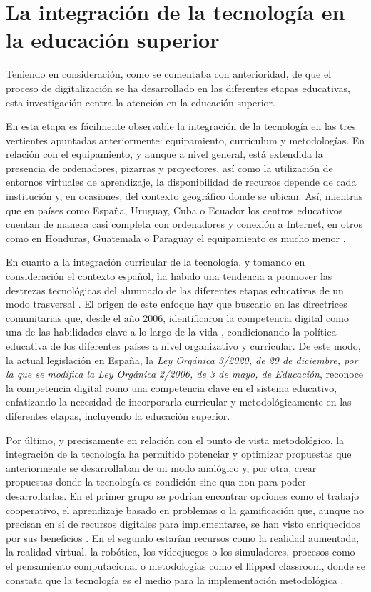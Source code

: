 \section{La integración de la tecnología en la educación superior}\label{sec-laintegracióndelatecnologíaenlaeducaciónsuperior}

Teniendo en consideración, como se comentaba con anterioridad, de que el
proceso de digitalización se ha desarrollado en las diferentes etapas
educativas, esta investigación centra la atención en la educación
superior.

En esta etapa es fácilmente observable la integración de la tecnología
en las tres vertientes apuntadas anteriormente: equipamiento, currículum
y metodologías. En relación con el equipamiento, y aunque a nivel
general, está extendida la presencia de ordenadores, pizarras y
proyectores, así como la utilización de entornos virtuales de
aprendizaje, la disponibilidad de recursos depende de cada institución
y, en ocasiones, del contexto geográfico donde se ubican. Así, mientras
que en países como España, Uruguay, Cuba o Ecuador los centros
educativos cuentan de manera casi completa con ordenadores y conexión a
Internet, en otros como en Honduras, Guatemala o Paraguay el
equipamiento es mucho menor \cite{siteal}.

En cuanto a la integración curricular de la tecnología, y tomando en
consideración el contexto español, ha habido una tendencia a promover
las destrezas tecnológicas del alumnado de las diferentes etapas
educativas de un modo trasversal \cite{gabarda2021b}. El origen de este
enfoque hay que buscarlo en las directrices comunitarias que, desde el
año 2006, identificaron la competencia digital como una de las
habilidades clave a lo largo de la vida \cite{comision2006,consejo2018}, condicionando la política educativa de los diferentes
países a nivel organizativo y curricular. De este modo, la actual
legislación en España, la \emph{Ley Orgánica 3/2020, de 29 de diciembre,
por la que se modifica la Ley Orgánica 2/2006, de 3 de mayo, de
Educación}, reconoce la competencia digital como una competencia clave
en el sistema educativo, enfatizando la necesidad de incorporarla
curricular y metodológicamente en las diferentes etapas, incluyendo la
educación superior.

Por último, y precisamente en relación con el punto de vista
metodológico, la integración de la tecnología ha permitido potenciar y
optimizar propuestas que anteriormente se desarrollaban de un modo
analógico y, por otra, crear propuestas donde la tecnología es condición
sine qua non para poder desarrollarlas. En el primer grupo se podrían
encontrar opciones como el trabajo cooperativo, el aprendizaje basado en
problemas o la gamificación que, aunque no precisan en sí de recursos
digitales para implementarse, se han visto enriquecidos por sus
beneficios \cite{cuevas2021,pacheco2022,sanchezrivas2023}. En el segundo estarían recursos como la realidad aumentada, la
realidad virtual, la robótica, los videojuegos o los simuladores,
procesos como el pensamiento computacional o metodologías como el
flipped classroom, donde se constata que la tecnología es el medio para
la implementación metodológica \cite{gonzalez-martinez2024,sanchezsoto2023}.

